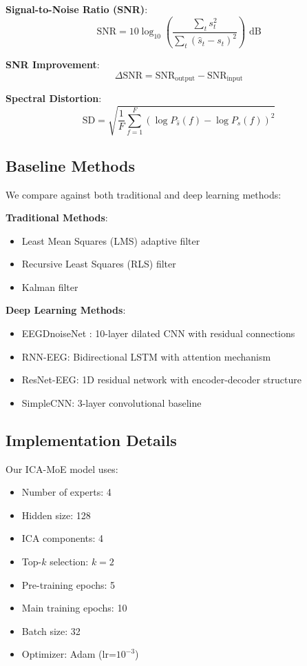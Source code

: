 \documentclass[journal]{IEEEtran}
\begin{document}
\textbf{Signal-to-Noise Ratio (SNR)}:
\begin{equation}
\text{SNR} = 10 \log_{10}\left(\frac{\sum_t s_t^2}{\sum_t (\hat{s}_t - s_t)^2}\right) \text{ dB}
\end{equation}

\textbf{SNR Improvement}:
\begin{equation}
\Delta\text{SNR} = \text{SNR}_{\text{output}} - \text{SNR}_{\text{input}}
\end{equation}

\textbf{Spectral Distortion}:
\begin{equation}
\text{SD} = \sqrt{\frac{1}{F}\sum_{f=1}^{F}\left(\log P_{\hat{s}}(f) - \log P_s(f)\right)^2}
\end{equation}

\subsection{Baseline Methods}

We compare against both traditional and deep learning methods:

\textbf{Traditional Methods}:
\begin{itemize}
\item Least Mean Squares (LMS) adaptive filter \cite{widrow1975adaptive}
\item Recursive Least Squares (RLS) filter \cite{haykin2014adaptive}
\item Kalman filter \cite{morbidi2008application}
\end{itemize}

\textbf{Deep Learning Methods}:
\begin{itemize}
\item EEGDnoiseNet \cite{zhang2021eegdenoisenet}: 10-layer dilated CNN with residual connections
\item RNN-EEG: Bidirectional LSTM with attention mechanism
\item ResNet-EEG: 1D residual network with encoder-decoder structure
\item SimpleCNN: 3-layer convolutional baseline
\end{itemize}

\subsection{Implementation Details}

Our ICA-MoE model uses:
\begin{itemize}
\item Number of experts: 4
\item Hidden size: 128
\item ICA components: 4
\item Top-$k$ selection: $k=2$
\item Pre-training epochs: 5
\item Main training epochs: 10
\item Batch size: 32
\item Optimizer: Adam (lr=$10^{-3}$)
\end{itemize}
\end{document}
